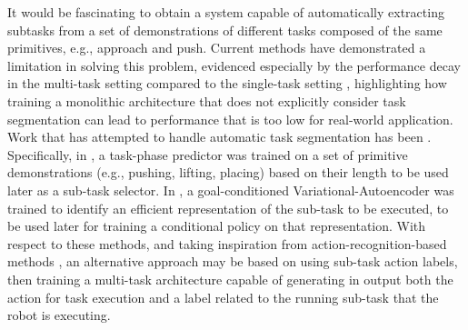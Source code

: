 It would be fascinating to obtain a system capable of automatically extracting subtasks from a set of demonstrations of different tasks composed of the same primitives, e.g., approach and push. Current methods \cite{jang2022bc_z,mandi2022towards_more_generalizable_one_shot} have demonstrated a limitation in solving this problem, evidenced especially by the performance decay in the multi-task setting compared to the single-task setting \cite{mandi2022towards_more_generalizable_one_shot,zhang2018deep_vr_teleoperation}, highlighting how training a monolithic architecture that does not explicitly consider task segmentation can lead to performance that is too low for real-world application. Work that has attempted to handle automatic task segmentation has been \cite{yu2018one_shot_hil,Mandlekar2020GTI}. Specifically, in \cite{yu2018one_shot_hil}, a task-phase predictor was trained on a set of primitive demonstrations (e.g., pushing, lifting, placing) based on their length to be used later as a sub-task selector. In \cite{Mandlekar2020GTI}, a goal-conditioned Variational-Autoencoder was trained to identify an efficient representation of the sub-task to be executed, to be used later for training a conditional policy on that representation. With respect to these methods, and taking inspiration from action-recognition-based methods \cite{goyal2017something2something}, an alternative approach may be based on using sub-task action labels, then training a multi-task architecture capable of generating in output both the action for task execution and a label related to the running sub-task that the robot is executing.

